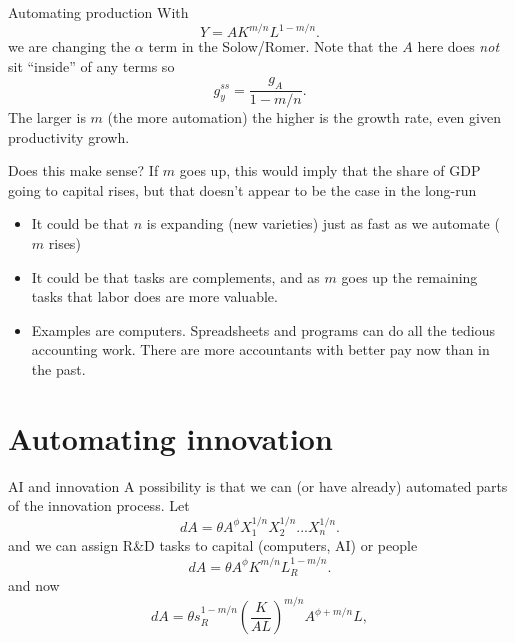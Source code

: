 \begin{frame}{Automating production}
With
\begin{equation}
	Y = A K^{m/n} L^{1 - m/n}. \label{EQ_Y_mn}
\end{equation}
we are changing the $\alpha$ term in the Solow/Romer. Note that the $A$ here does \textit{not} sit ``inside'' of any terms so
\begin{equation}
 	g_y^{ss} = \frac{g_A}{1-m/n}. \label{EQ_gy_mn}
 \end{equation} 
The larger is $m$ (the more automation) the higher is the growth rate, even given productivity growh. 
\end{frame}

\begin{frame}{Does this make sense?}
If $m$ goes up, this would imply that the share of GDP going to capital rises, but that doesn't appear to be the case in the long-run
\begin{itemize}
	\item It could be that $n$ is expanding (new varieties) just as fast as we automate ($m$ rises)
	\item It could be that tasks are complements, and as $m$ goes up the remaining tasks that labor does are more valuable.
	\item Examples are computers. Spreadsheets and programs can do all the tedious accounting work. There are more accountants with better pay now than in the past. 
\end{itemize}
\end{frame}

\section{Automating innovation}
\begin{frame}{AI and innovation}
A possibility is that we can (or have already) automated parts of the innovation process. Let
\begin{equation}
	dA = \theta A^{\phi} X_1^{1/n} X_2^{1/n}...X_n^{1/n}. \nonumber
\end{equation}
and we can assign R\&D tasks to capital (computers, AI) or people
\begin{equation}
	dA = \theta A^{\phi} K^{m/n} L_R^{1-m/n}. \nonumber
\end{equation}
and now
\begin{equation}
	dA = \theta s_R^{1-m/n}\left(\frac{K}{AL}\right)^{m/n} A^{\phi+m/n} L, \nonumber
\end{equation}
\end{frame}

